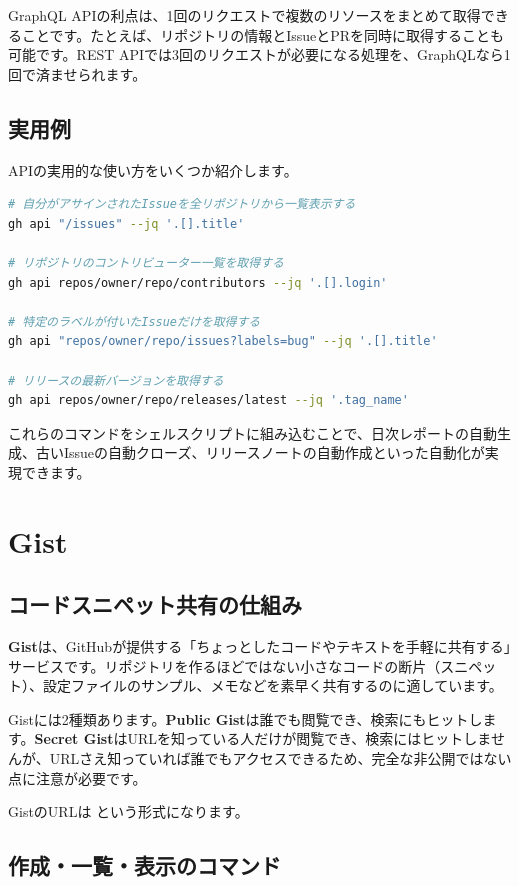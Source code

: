 GraphQL APIの利点は、1回のリクエストで複数のリソースをまとめて取得できることです。たとえば、リポジトリの情報とIssueとPRを同時に取得することも可能です。REST APIでは3回のリクエストが必要になる処理を、GraphQLなら1回で済ませられます。

\subsection{実用例}

APIの実用的な使い方をいくつか紹介します。

\begin{lstlisting}[language=bash]
# 自分がアサインされたIssueを全リポジトリから一覧表示する
gh api "/issues" --jq '.[].title'

# リポジトリのコントリビューター一覧を取得する
gh api repos/owner/repo/contributors --jq '.[].login'

# 特定のラベルが付いたIssueだけを取得する
gh api "repos/owner/repo/issues?labels=bug" --jq '.[].title'

# リリースの最新バージョンを取得する
gh api repos/owner/repo/releases/latest --jq '.tag_name'
\end{lstlisting}

これらのコマンドをシェルスクリプトに組み込むことで、日次レポートの自動生成、古いIssueの自動クローズ、リリースノートの自動作成といった自動化が実現できます。

\section{Gist}

\subsection{コードスニペット共有の仕組み}

\textbf{Gist}は、GitHubが提供する「ちょっとしたコードやテキストを手軽に共有する」サービスです。リポジトリを作るほどではない小さなコードの断片（スニペット）、設定ファイルのサンプル、メモなどを素早く共有するのに適しています。

Gistには2種類あります。\textbf{Public Gist}は誰でも閲覧でき、検索にもヒットします。\textbf{Secret Gist}はURLを知っている人だけが閲覧でき、検索にはヒットしませんが、URLさえ知っていれば誰でもアクセスできるため、完全な非公開ではない点に注意が必要です。

GistのURLは  という形式になります。

\subsection{作成・一覧・表示のコマンド}

